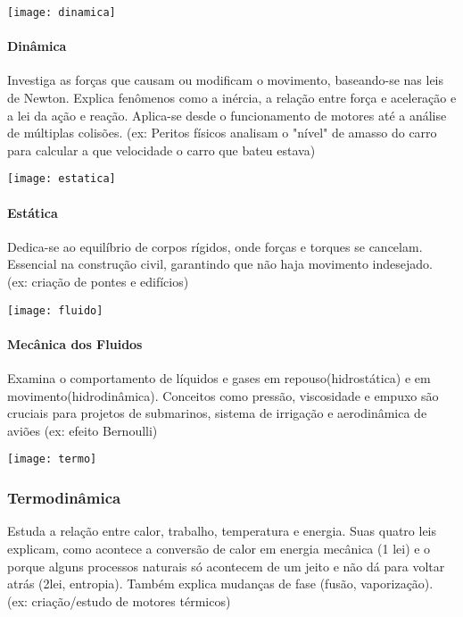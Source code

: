 \documentclass[portuguese,11pt,a4paper,oneside,openany,notitlepage]{article}
\begin{document}
	\begin{center}
		\texttt{[image: dinamica]}
	\end{center}
	
	\paragraph{Dinâmica}
	Investiga as forças que causam ou modificam o movimento, baseando-se nas leis de Newton. Explica fenômenos como a inércia, a relação entre força e aceleração e a lei da ação e reação. Aplica-se desde o funcionamento de motores até a análise de múltiplas colisões. \newline (ex: Peritos físicos analisam o "nível" de amasso do carro para calcular a que velocidade o carro que bateu estava)
	
	\begin{center}
		\texttt{[image: estatica]}
	\end{center}
	
	\paragraph{Estática}
	Dedica-se ao equilíbrio de corpos rígidos, onde forças e torques se cancelam. Essencial na construção civil, garantindo que não haja movimento indesejado. \newline (ex: criação de pontes e edifícios)
	
	\begin{center}
		\texttt{[image: fluido]}
	\end{center}
	
	\paragraph{Mecânica dos Fluidos}
	Examina o comportamento de líquidos e gases em repouso(hidrostática) e em movimento(hidrodinâmica). Conceitos como pressão, viscosidade e empuxo são cruciais para projetos de submarinos, sistema de irrigação e aerodinâmica de aviões \newline (ex: efeito Bernoulli)
	
	\begin{center}
		\texttt{[image: termo]}
	\end{center}
	
	\subsubsection{Termodinâmica}
	Estuda a relação entre calor, trabalho, temperatura e energia. Suas quatro leis explicam, como acontece a conversão de calor em energia mecânica (1\textordfeminine{} lei) e o porque alguns processos naturais só acontecem de um jeito e não dá para voltar atrás (2\textordfeminine lei, entropia). Também explica mudanças de fase (fusão, vaporização). \newline (ex: criação/estudo de motores térmicos)
	
\end{document}
